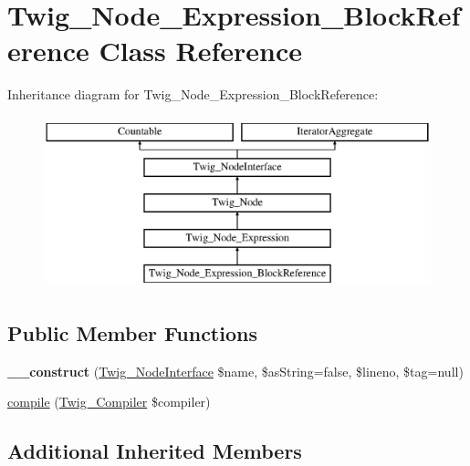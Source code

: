 \hypertarget{class_twig___node___expression___block_reference}{}\section{Twig\+\_\+\+Node\+\_\+\+Expression\+\_\+\+Block\+Reference Class Reference}
\label{class_twig___node___expression___block_reference}
Inheritance diagram for Twig\+\_\+\+Node\+\_\+\+Expression\+\_\+\+Block\+Reference\+:\begin{figure}[H]
\begin{center}
\leavevmode
\includegraphics[height=5.000000cm]{class_twig___node___expression___block_reference}
\end{center}
\end{figure}
\subsection*{Public Member Functions}
\begin{DoxyCompactItemize}
\item 
\hypertarget{class_twig___node___expression___block_reference_ad6e928c292a34c4a54a6a67003fe34b9}{}{\bfseries \+\_\+\+\_\+construct} (\hyperlink{interface_twig___node_interface}{Twig\+\_\+\+Node\+Interface} \$name, \$as\+String=false, \$lineno, \$tag=null)\label{class_twig___node___expression___block_reference_ad6e928c292a34c4a54a6a67003fe34b9}

\item 
\hyperlink{class_twig___node___expression___block_reference_a4e0faa87c3fae583620b84d3607085da}{compile} (\hyperlink{class_twig___compiler}{Twig\+\_\+\+Compiler} \$compiler)
\end{DoxyCompactItemize}
\subsection*{Additional Inherited Members}


